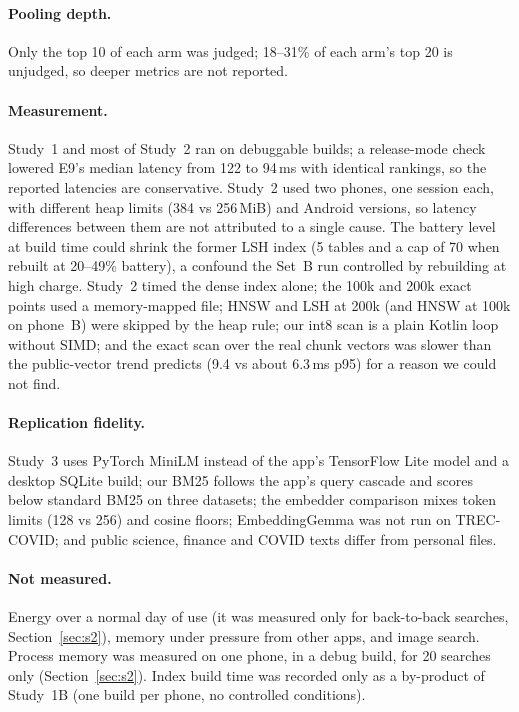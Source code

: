 \documentclass[pdflatex,sn-basic,Numbered]{sn-jnl}
\begin{document}
\paragraph{Pooling depth.} Only the top 10 of each arm was judged; 18--31\% of each arm's top 20 is unjudged, so deeper metrics are not reported.

\paragraph{Measurement.} Study~1 and most of Study~2 ran on debuggable builds; a release-mode check lowered E9's median latency from 122 to 94\,ms with identical rankings, so the reported latencies are conservative. Study~2 used two phones, one session each, with different heap limits (384 vs 256\,MiB) and Android versions, so latency differences between them are not attributed to a single cause. The battery level at build time could shrink the former LSH index (5 tables and a cap of 70 when rebuilt at 20--49\% battery), a confound the Set~B run controlled by rebuilding at high charge. Study~2 timed the dense index alone; the 100k and 200k exact points used a memory-mapped file; HNSW and LSH at 200k (and HNSW at 100k on phone~B) were skipped by the heap rule; our int8 scan is a plain Kotlin loop without SIMD; and the exact scan over the real chunk vectors was slower than the public-vector trend predicts (9.4 vs about 6.3\,ms p95) for a reason we could not find.

\paragraph{Replication fidelity.} Study~3 uses PyTorch MiniLM instead of the app's TensorFlow Lite model and a desktop SQLite build; our BM25 follows the app's query cascade and scores below standard BM25 on three datasets; the embedder comparison mixes token limits (128 vs 256) and cosine floors; EmbeddingGemma was not run on TREC-COVID; and public science, finance and COVID texts differ from personal files.

\paragraph{Not measured.} Energy over a normal day of use (it was measured only for back-to-back searches, Section~\ref{sec:s2}), memory under pressure from other apps, and image search. Process memory was measured on one phone, in a debug build, for 20 searches only (Section~\ref{sec:s2}). Index build time was recorded only as a by-product of Study~1B (one build per phone, no controlled conditions).
\end{document}
